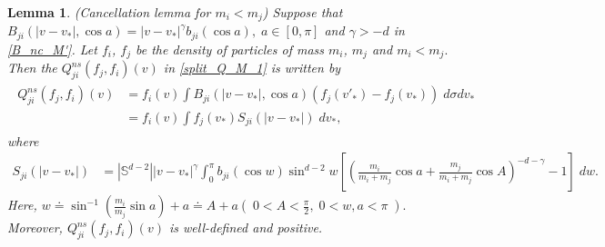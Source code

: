 \documentclass[reqno,10pt]{amsart}
\newtheorem{lemma}[theorem]{Lemma}
\numberwithin{equation}{section}
\begin{document}
\begin{lemma} (Cancellation lemma for $m_i < m_j$) \label{CC_M_1}
Suppose that $B_{ji}(|v-v_*|,\cos a)=|v-v_*|^{\gamma}b_{ji}(\cos a), \;a \in [0,\pi]$
and $\gamma>-d$ in \eqref{B_nc_M'}. Let $f_i$, $f_j$ be the density of particles of mass $m_i$, $m_j$ and $m_i<m_j.$ Then the $Q_{ji}^{ns}(f_j,f_i)(v)$ in \eqref{split_Q_M_1} is written by  
\begin{align}  \label{Qns_CC_M_1} 
\begin{split}
    Q_{ji}^{ns}(f_j, f_i)(v) &= f_i(v)\int B_{ji}(|v-v_*|, \cos a)(f_j(v'_*)-f_j(v_*)) \; d\sigma dv_*
    \\&= f_i(v) \int f_j(v_*)S_{ji}(|v-v_*|) \; dv_*,
\end{split}
\end{align}
where  
\begin{align*}
    S_{ji}(|v-v_*|)
    &= |\mathbb{S}^{d-2}||v-v_*|^{\gamma}\int_0^\pi b_{ji}(\cos w)\sin^{d-2}w [(\frac{m_i}{m_i+m_j}\cos a + \frac{m_j}{m_i+m_j}\cos A)^{-d-\gamma}-1] \; dw.
\end{align*}
Here, $w \doteq \sin^{-1}(\frac{m_i}{m_j}\sin a)+a \doteq A+a(\;0<A<\frac{\pi}{2}, \; 0<w,a<\pi \;).$
Moreover, $Q_{ji}^{ns}(f_j,f_i)(v)$ is well-defined and positive.
\end{lemma}
\end{document}
